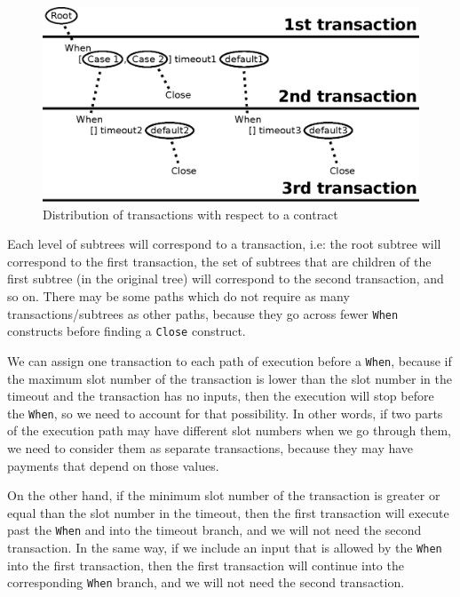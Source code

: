 \documentclass[english,runningheads]{llncs}
\begin{document}
\begin{figure}
\includegraphics[width=1\textwidth]{figures/transactions}

\caption{Distribution of transactions with respect to a contract\label{fig:Distribution-of-transactions}}

\end{figure}

Each level of subtrees will correspond to a transaction, i.e: the
root subtree will correspond to the first transaction, the set of
subtrees that are children of the first subtree (in the original tree)
will correspond to the second transaction, and so on. There may be
some paths which do not require as many transactions/subtrees as other
paths, because they go across fewer \texttt{When} constructs before
finding a \texttt{Close} construct.

We can assign one transaction to each path of execution before a \texttt{When},
because if the maximum slot number of the transaction is lower than
the slot number in the timeout and the transaction has no inputs,
then the execution will stop before the \texttt{When}, so we need
to account for that possibility. In other words, if two parts of the
execution path may have different slot numbers when we go through
them, we need to consider them as separate transactions, because they
may have payments that depend on those values.

On the other hand, if the minimum slot number of the transaction is greater
or equal than the slot number in the timeout, then the first transaction
will execute past the \texttt{When} and into the timeout branch, and
we will not need the second transaction. In the same way, if we include
an input that is allowed by the \texttt{When} into the first transaction,
then the first transaction will continue into the corresponding \texttt{When}
branch, and we will not need the second transaction.
\end{document}

